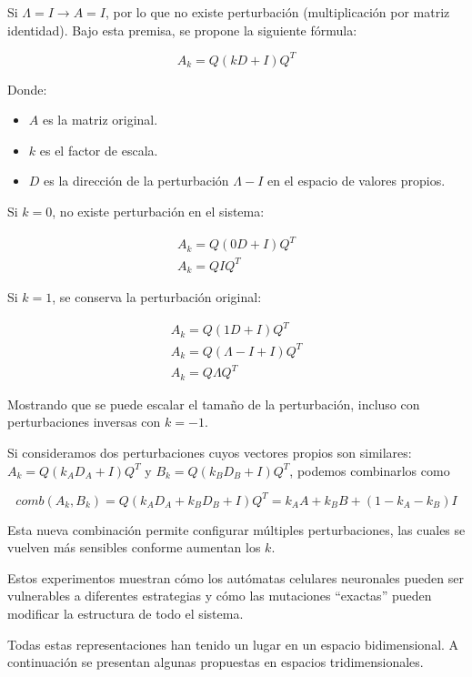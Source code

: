 Si $\Lambda = I \to A = I$, por lo que no existe perturbación (multiplicación por matriz identidad). Bajo esta premisa, se propone la siguiente fórmula:

\[ A_k = Q(kD + I)Q^T\]

Donde:

\begin{itemize}
	
	\item $A$ es la matriz original.
	
	\item $k$ es el factor de escala.
	
	\item $D$ es la dirección de la perturbación $\Lambda - I$ en el espacio de valores propios. 
	
\end{itemize}

Si $k = 0$, no existe perturbación en el sistema:

\begin{gather*}
	A_k = Q(0D + I)Q^T \\
	A_k = Q I Q^T
\end{gather*}

Si $k = 1$, se conserva la perturbación original:

\begin{gather*}
	A_k = Q(1D + I)Q^T \\
	A_k = Q(\Lambda - I + I)Q^T \\
	A_k = Q \Lambda Q^T
\end{gather*}

Mostrando que se puede escalar el tamaño de la perturbación, incluso con perturbaciones inversas con $k = -1$.

Si consideramos dos perturbaciones cuyos vectores propios son similares: $A_k = Q(k_AD_A + I)Q^T$ y $B_k = Q(k_B D_B + I)Q^T$, podemos combinarlos como

\[ comb(A_k, B_k) = Q (k_A D_A + k_B D_B + I) Q^T = k_A A + k_B B + (1 - k_A - k_B) I \]

Esta nueva combinación permite configurar múltiples perturbaciones, las cuales se vuelven más sensibles conforme aumentan los $k$.

Estos experimentos muestran cómo los autómatas celulares neuronales pueden ser vulnerables a diferentes estrategias y cómo las mutaciones ``exactas'' pueden modificar la estructura de todo el sistema.

Todas estas representaciones han tenido un lugar en un espacio bidimensional. A continuación se presentan algunas propuestas en espacios tridimensionales. 

